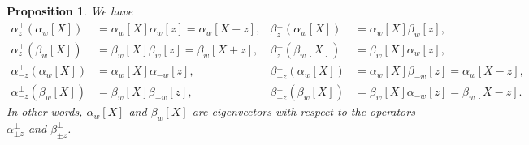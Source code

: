 \documentclass[12pt]{amsart}%
\newtheorem{proposition}[theorem]{Proposition}
\theoremstyle{remark}
\theoremstyle{definition}
\begin{document}
    \begin{proposition}\label{prop: action of adjoint}
        We have
        \begin{align*}
            \alpha_z^\perp(\alpha_w[X])&=\alpha_w[X]\alpha_w[z]=\alpha_w[X+z],&
            \beta_{z}^\perp (\alpha_w[X])&=\alpha_w[X]\beta_w[z],\\
            \alpha_z^\perp (\beta_w[X])&=\beta_w[X]\beta_w[z]=\beta_w[X+z],&
            \beta_{z}^\perp (\beta_w[X])&=\beta_w[X]\alpha_w[z],\\
            \alpha_{-z}^\perp (\alpha_w[X])&=\alpha_w[X]\alpha_{-w}[z],&
            \beta_{-z}^\perp (\alpha_w[X])&=\alpha_w[X]\beta_{-w}[z]=\alpha_w[X-z],\\
            \alpha_{-z}^\perp (\beta_w[X])&=\beta_w[X]\beta_{-w}[z],&
            \beta_{-z}^\perp (\beta_w[X])&=\beta_w[X]\alpha_{-w}[z]=\beta_w[X-z].
        \end{align*}
        In other words, $\alpha_w[X]$ and $\beta_w[X]$ are eigenvectors with respect to the operators $\alpha_{\pm z}^\perp$ and $\beta_{\pm z}^\perp$.
    \end{proposition}
\end{document}
